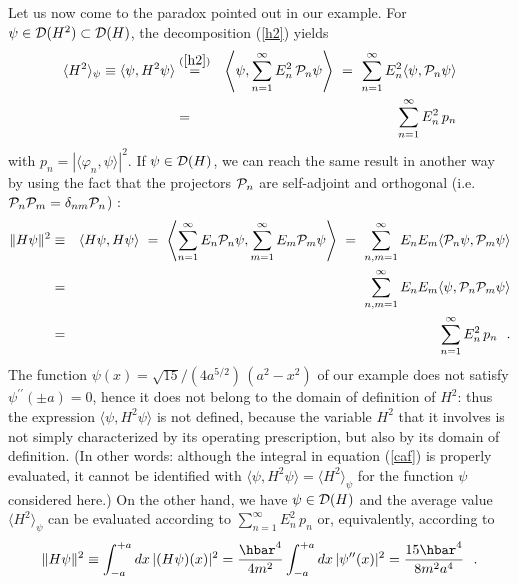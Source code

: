 \documentclass[12pt]{report}
\begin{document}
Let us now come to the paradox pointed out in our example. For 
$\psi \in
{\cal D}(H^2) \subset {\cal D}(H)$,
 the decomposition (\ref{h2})
yields 
\begin{eqnarray}
\nonumber
\langle H^2 \rangle_{\psi} \equiv 
\langle \psi , H^2 \psi \rangle 
& \stackrel{(\ref{h2})}{=} & 
\left\langle \psi ,
\sum_{n=1}^{\infty} E_n^2 \, {\cal P}_n \psi \right\rangle 
\ = \ 
\sum_{n=1}^{\infty} E_n^2 \langle \psi , {\cal P}_n \psi \rangle
\\
&= &
\sum_{n=1}^{\infty} E_n^2 \, p_n  
\end{eqnarray}
 with $p_n = |  \langle \varphi_n , \psi \rangle  |^2$.
 If $\psi \in {\cal D} (H)$, we can reach the same result 
 in another way by using the fact that the projectors 
${\cal P}_n$ are self-adjoint and orthogonal 
(i.e. ${\cal P}_n {\cal P}_m = \delta_{nm} {\cal P}_n$) :
\begin{eqnarray}
\| H \psi \|^2 
&\equiv & 
\langle H \psi ,  H\psi \rangle
\ = \ \left\langle \sum_{n=1}^{\infty} E_n {\cal P}_n \psi ,
\sum_{m=1}^{\infty} E_m {\cal P}_m \psi \right\rangle 
\ = \ 
\sum_{n,m=1}^{\infty} E_n E_m \langle {\cal P}_n \psi , {\cal P}_m \psi
\rangle
\nonumber
\\
& = &
\sum_{n,m=1}^{\infty} E_n E_m \langle \psi , {\cal P}_n {\cal P}_m \psi
\rangle
\nonumber
\\
&=&
\sum_{n=1}^{\infty} E_n^2 \, p_n 
\ \ .
\end{eqnarray}
 The function
$\psi(x) = \sqrt{15}/(4a^{5/2}) \,
(a^2 - x^2)$ of our example does not satisfy  
$\psi^{\prime \prime} (\pm a) =0$, hence it does not belong 
to the domain of definition of $H^2$: thus the expression 
$\langle \psi, H^2 \psi \rangle$ is not defined, because the  
 variable $H^2$ that it involves is not simply characterized  by  
its operating prescription, but also by its domain of definition. 
(In other words: although the integral in equation
(\ref{caf}) is properly evaluated, it cannot be
identified with  $\langle \psi , H^2 \psi \rangle = \langle H^2
\rangle_{\psi}$ for the function $\psi$
considered here.)
On the other hand, we have $\psi \in {\cal D} (H)$ and the average value 
$\langle H^2 \rangle _{\psi}$
can be evaluated according to 
$\sum_{n=1}^{\infty} E_n^2 \, p_n$ 
or, equivalently, according to 
\[
\| H \psi \|^2 \equiv 
\int_{-a}^{+a} dx \, | (H\psi )(x) | ^2 =
\ds{\hbar^4 \over 4m^2}
\int_{-a}^{+a} dx \, | \psi^{\prime \prime} (x) | ^2 =
\ds{15 \hbar^4 \over 8m^2 a^4}
\ \ .
\]
 
 
\bigskip
 
\end{document}
